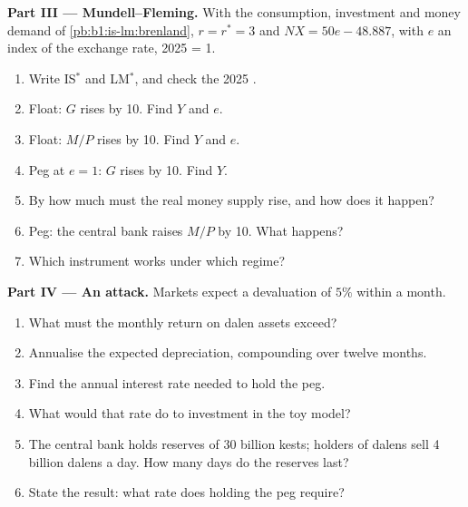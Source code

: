 \begin{problem}
\medskip\noindent\textbf{Part III --- Mundell--Fleming.} With the consumption,
investment and money demand of \cref{pb:b1:is-lm:brenland}, $r = r^* = 3$ and
$NX = 50e - 48.887$, with $e$ an index of the exchange rate, 2025 = 1.
\begin{enumerate}[resume]
  \item Write IS$^*$ and LM$^*$, and check the 2025 .
  \item Float: $G$ rises by 10. Find $Y$ and $e$.
  \item Float: $M/P$ rises by 10. Find $Y$ and $e$.
  \item Peg at $e = 1$: $G$ rises by 10. Find $Y$.
  \item By how much must the real money supply rise, and how does it happen?
  \item Peg: the central bank raises $M/P$ by 10. What happens?
  \item Which instrument works under which regime?
\end{enumerate}

\medskip\noindent\textbf{Part IV --- An attack.} Markets expect a devaluation of $5\%$
within a month.
\begin{enumerate}[resume]
  \item What must the monthly return on dalen assets exceed?
  \item Annualise the expected depreciation, compounding over twelve months.
  \item Find the annual interest rate needed to hold the peg.
  \item What would that rate do to investment in the toy model?
  \item The central bank holds reserves of 30 billion kests; holders of dalens
    sell 4 billion dalens a day. How many days do the reserves last?
  \item State the result: what rate does holding the peg require?
\end{enumerate}
\end{problem}

